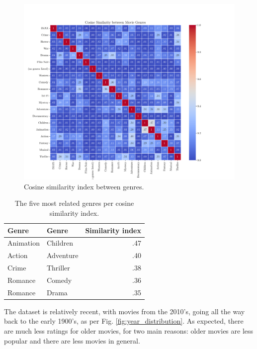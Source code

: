 \documentclass[conference]{IEEEtran}
\begin{document}
\begin{figure}[H]
    \centering
    \includegraphics[width=1\linewidth]{assets/genre_similarity.png}
    \caption{Cosine similarity index between genres.}
    \label{fig:genre_similarity}
\end{figure}

\begin{table}[H]
\centering
\caption{The five most related genres per cosine similarity index.}
\label{tab:genre_similarity}
\begin{tabular}{llr}
\toprule
\textbf{Genre} & \textbf{Genre} & \textbf{Similarity index} \\
\midrule
Animation & Children & .47 \\ 
Action & Adventure & .40 \\
Crime & Thriller & .38 \\
Romance & Comedy & .36 \\
Romance & Drama & .35 \\
\bottomrule
\end{tabular}
\end{table} 

The dataset is relatively recent, with movies from the 2010's, going all the way back to the early 1900's, as per Fig. \ref{fig:year_distribution}. As expected, there are much less ratings for older movies, for two main reasons: older movies are less popular and there are less movies in general.
\end{document}
